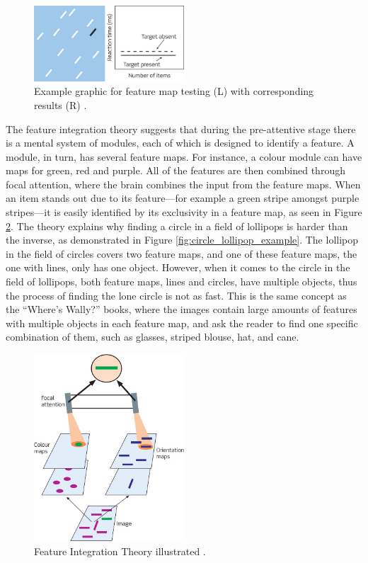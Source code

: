 \begin{figure}[h!]
	\centering
	\includegraphics[width=0.5\textwidth]{figures/Visual_search_paradigm_I.jpg}
	\caption{Example graphic for feature map testing (L) with corresponding results (R) \cite{snowden2012basic}.}\label{fig:visual_search_paradign_i}
\end{figure}

The feature integration theory suggests that during the pre-attentive stage there is a mental system of modules, each of which is designed to identify a feature. A module, in turn, has several feature maps. For instance, a colour module can have maps for green, red and purple. All of the features are then combined through focal attention, where the brain combines the input from the feature maps. When an item stands out due to its feature---for example a green stripe amongst purple stripes---it is easily identified by its exclusivity in a feature map, as seen in Figure \ref{fig:feature_integration_theory}. The theory explains why finding a circle in a field of lollipops is harder than the inverse, as demonstrated in Figure \ref{fig:circle_lollipop_example}. The lollipop in the field of circles covers two feature maps, and one of these feature maps, the one with lines, only has one object. However, when it comes to the circle in the field of lollipops, both feature maps, lines and circles, have multiple objects, thus the process of finding the lone circle is not as fast. This is the same concept as the “Where’s Wally?” books, where the images contain large amounts of features with multiple objects in each feature map, and ask the reader to find one specific combination of them, such as glasses, striped blouse, hat, and cane.

\begin{figure}[h!]
	\centering
	\includegraphics[width=0.5\textwidth]{figures/feature_integration_theory.jpg}
	\caption{Feature Integration Theory illustrated \cite{snowden2012basic}.}\label{fig:feature_integration_theory}
\end{figure}

